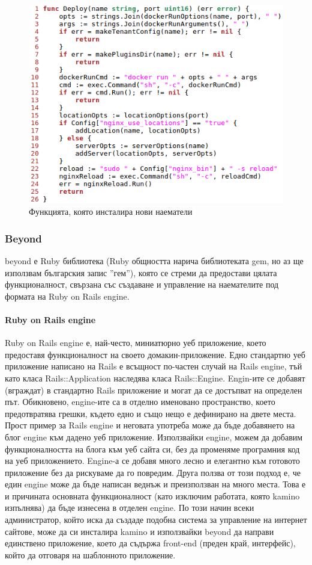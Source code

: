 \documentclass[pdftex,14pt,a4paper]{extreport}
\begin{document}
\begin{figure}[h]
  \centering
  \includegraphics[scale=0.8]{./snippets/kamino_deploy}
  \caption{Функцията, която инсталира нови наематели}
\end{figure}
\subsubsection {Beyond}
beyond е Ruby библиотека (Ruby общността нарича библиотеката gem, но аз ще използвам българския запис ''гем''), която се стреми да предостави цялата функционалност, свързана със създаване и управление на наемателите под формата на Ruby on Rails engine.
\paragraph {Ruby on Rails engine}
Ruby on Rails engine е, най-често, миниатюрно уеб приложение, което предоставя функционалност на своето домакин-приложение. Едно стандартно уеб приложение написано на Rails е всъщност по-частен случай на Rails engine, тъй като класа Rails::Application наследява класа Rails::Engine. Engin-ите се добавят (вграждат) в стандартно Rails приложение и могат да се достъпват на определен път. Обикновено, engine-ите са в отделно именовано пространство, което предотвратява грешки, където едно и също нещо е дефинирано на двете места. Прост пример за Rails engine и неговата употреба може да бъде добавянето на блог engine към дадено уеб приложение. Използвайки engine, можем да добавим функционалността на блога към уеб сайта си, без да променяме програмния код на уеб приложението. Engine-а се добавя много лесно и елегантно към готовото приложение без да рискуваме да го повредим. Друга ползва от този подход е, че един engine може да бъде написан веднъж и преизползван на много места. Това е и причината основната функционалност (като изключим работата, която kamino изпълнява) да бъде изнесена в отделен engine. По този начин всеки администратор, който иска да създаде подобна система за управление на интернет сайтове, може да си инсталира kamino и използвайки beyond да направи единствено приложение, което да съдържа front-end (преден край, интерфейс), който да отговаря на шаблонното приложение.
\end{document}
